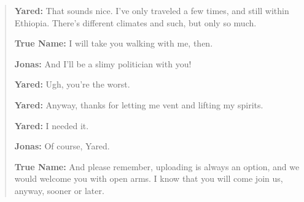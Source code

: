 \begin{quote}
\textbf{Yared:} That sounds nice. I've only traveled a few times, and still within Ethiopia. There's different climates and such, but only so much.

\textbf{True Name:} I will take you walking with me, then.

\textbf{Jonas:} And I'll be a slimy politician with you!

\textbf{Yared:} Ugh, you're the worst.

\textbf{Yared:} Anyway, thanks for letting me vent and lifting my spirits.

\textbf{Yared:} I needed it.

\textbf{Jonas:} Of course, Yared.

\textbf{True Name:} And please remember, uploading is always an option, and we would welcome you with open arms. I know that you will come join us, anyway, sooner or later.
\end{quote}
